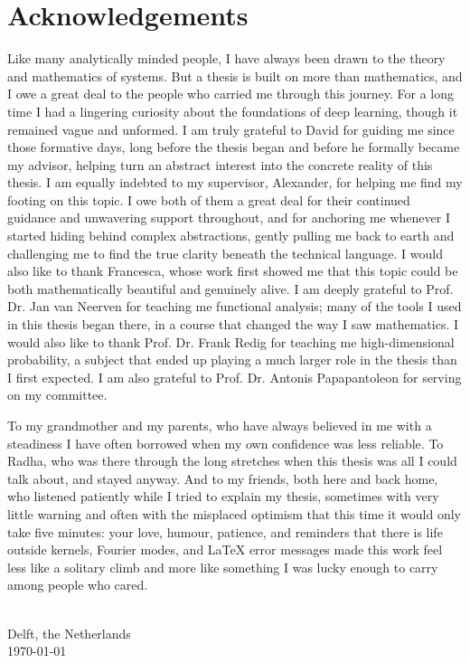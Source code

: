 \chapter{Acknowledgements}
\label{cha:Acknowledgements}

Like many analytically minded people, I have always been drawn to the theory
and mathematics of systems. But a thesis is built on more than mathematics, and
I owe a great deal to the people who carried me through this journey. For a
long time I had a lingering curiosity about the foundations of deep learning,
though it remained vague and unformed. I am truly grateful to David for guiding
me since those formative days, long before the thesis began and before he
formally became my advisor, helping turn an abstract interest into the concrete
reality of this thesis. I am equally indebted to my supervisor, Alexander, for
helping me find my footing on this topic. I owe both of them a great deal for
their continued guidance and unwavering support throughout, and for anchoring
me whenever I started hiding behind complex abstractions, gently pulling me
back to earth and challenging me to find the true clarity beneath the technical
language. I would also like to thank Francesca, whose work first showed me that
this topic could be both mathematically beautiful and genuinely alive. I am
deeply grateful to Prof. Dr. Jan van Neerven for teaching me functional
analysis; many of the tools I used in this thesis began there, in a course that
changed the way I saw mathematics. I would also like to thank Prof. Dr. Frank
Redig for teaching me high-dimensional probability, a subject that ended up
playing a much larger role in the thesis than I first expected. I am also
grateful to Prof. Dr. Antonis Papapantoleon for serving on my committee.

To my grandmother and my parents, who have always believed in me with a
steadiness I have often borrowed when my own confidence was less reliable. To
Radha, who was there through the long stretches when this thesis was all I
could talk about, and stayed anyway. And to my friends, both here and back
home, who listened patiently while I tried to explain my thesis, sometimes with
very little warning and often with the misplaced optimism that this time it
would only take five minutes: your love, humour, patience, and reminders that
there is life outside kernels, Fourier modes, and LaTeX error messages made
this work feel less like a solitary climb and more like something I was lucky
enough to carry among people who cared.

\vskip0.1cm
\begin{flushright}
	\theauthor\\
	Delft, the Netherlands \\
	\today\\
\end{flushright}

